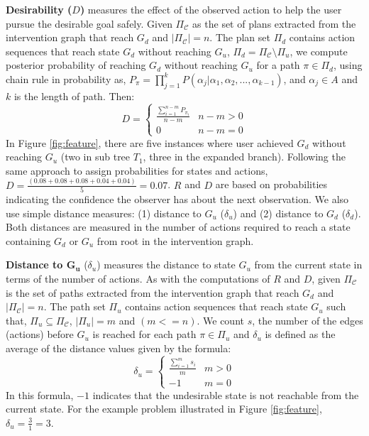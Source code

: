 \documentclass[letterpaper]{article}
\theoremstyle{plain}
\begin{document}
\textbf{Desirability ($D$)} measures the effect of the observed action to help the user pursue the desirable goal safely. Given $\Pi_{\mathcal{C}}$ as the set of plans extracted from the intervention graph that reach $G_d$ and $\left | \Pi_{\mathcal{C}} \right |=n$. The plan set $\Pi_{d}$ contains action sequences that reach state $G_d$ without reaching $G_u$, $\Pi_{d} = \Pi_{\mathcal{C}} \setminus \Pi_{u} $, we compute  posterior probability of reaching $G_d$ without reaching $G_u$ for a path $\pi \in \Pi_{d}$, using chain rule in probability as, $P_{\pi}=\prod_{j=1}^{k}P(\alpha_j|\alpha_1, \alpha_2,...,\alpha_{k-1})$, and $\alpha_{j} \in A$ and $k$ is the length of path. Then:
\begin{equation*} 
D = \left\{\begin{matrix}
\frac{\sum_{i=1}^{n-m}P_{\pi_i}}{n-m} & n-m>0\\ 
0 &  n-m=0
\end{matrix}\right.
\end{equation*} 
In Figure \ref{fig:feature}, there are five instances where user achieved $G_d$  without reaching $G_u$ (two in sub tree $T_1$, three in the expanded branch). Following the same approach to assign probabilities for states and actions, $D= \frac{(0.08+0.08+0.08+0.04+0.04)}{5} = 0.07$.
$R$ and $D$ are based on probabilities indicating the confidence the observer has about the next observation. We also use simple distance measures: (1) distance to $G_u$  ($\delta_u$) and (2) distance to $G_d$ ($\delta_d$). Both distances are measured in the number of actions required to reach a state containing $G_d$ or $G_u$ from root in the intervention graph.  

\textbf{Distance to $\boldsymbol{G_u}$} ($\delta_u$) measures the distance to state $G_u$ from the current state in terms of the number of actions. As with the computations of $R$ and $D$, given $\Pi_{\mathcal{C}}$ is the set of paths extracted from the intervention graph that reach $G_d$ and $\left | \Pi_{\mathcal{C}} \right |=n$. The path set $\Pi_{u}$ contains action sequences that reach state $G_u$ such that, $\Pi_{u} \subseteq \Pi_{\mathcal{C}}$, $\left | \Pi_{u} \right |=m$ and $(m<=n)$. We count  $s$, the number of the edges (actions) before $G_u$ is reached for each path $\pi \in \Pi_{u}$ and $\delta_u$ is defined as the average of the distance values given by the formula:
\begin{equation*} 
\delta_u = \left\{\begin{matrix}
\frac{\sum_{i=1}^{m}s_i}{m} & m>0\\ 
-1 &  m=0
\end{matrix}\right.
\end{equation*} 
In this formula, $-1$ indicates that the undesirable state is not reachable from the current state. For the example problem illustrated in Figure \ref{fig:feature}, $\delta_u=\frac{3}{1}=3$. 
\end{document}

